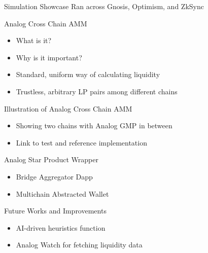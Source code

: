 \documentclass{beamer}
\begin{document}
\begin{frame}{Simulation Showcase}
    Ran across Gnosis, Optimism, and ZkSync
\end{frame}

\begin{frame}{Analog Cross Chain AMM}
    \begin{itemize}
        \item What is it?
        \item Why is it important?
        \item Standard, uniform way of calculating liquidity
        \item Trustless, arbitrary LP pairs among different chains
    \end{itemize}
\end{frame}

\begin{frame}{Illustration of Analog Cross Chain AMM}
    \begin{itemize}
        \item Showing two chains with Analog GMP in between
        \item Link to test and reference implementation
    \end{itemize}
\end{frame}

\begin{frame}{Analog Star Product Wrapper}
    \begin{itemize}
        \item Bridge Aggregator Dapp
        \item Multichain Abstracted Wallet
    \end{itemize}
\end{frame}

\begin{frame}{Future Works and Improvements}
    \begin{itemize}
        \item AI-driven heuristics function
        \item Analog Watch for fetching liquidity data
    \end{itemize}
\end{frame}
\end{document}
